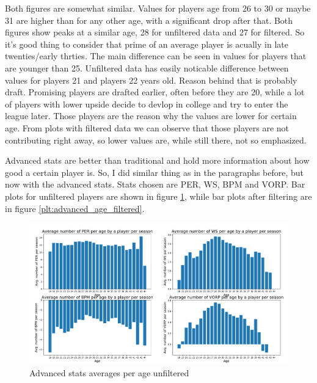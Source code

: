 \documentclass[a4paper]{article}
\begin{document}
Both figures are somewhat similar. Values for players age from 26 to 30 or maybe 31 are higher than for any other age, with a significant drop after that. Both figures show peaks at a similar age, 28 for unfiltered data and 27 for filtered. So it's good thing to consider that prime of an average player is acually in late twenties/early thrties. The main difference can be seen in values for players that are younger than 25. Unfiltered data has easily noticable difference between values for players 21 and players 22 years old. Reason behind that is probably draft. Promising players are drafted earlier, often before they are 20, while a lot of players with lower upside decide to devlop in college and try to enter the league later. Those players are the reason why the values are lower for certain age. From plots with filtered data we can observe that those players are not contributing right away, so lower values are, while still there, not so emphasized.

Advanced stats are better than traditional and hold more information about how good a certain player is. So, I did similar thing as in the paragraphs before, but now with the advanced stats. Stats chosen are PER, WS, BPM and VORP. Bar plots for unfiltered players are shown in figure \ref{plt:advanced_age}, while bar plots after filtering are in figure \ref{plt:advanced_age_filtered}.


\begin{figure}[h!]
\begin{center}
\includegraphics[scale=0.3]{advanced_stats_per_age.png}
\end{center}
\caption{Advanced stats averages per age unfiltered}
\label{plt:advanced_age}
\end{figure}
\end{document}
